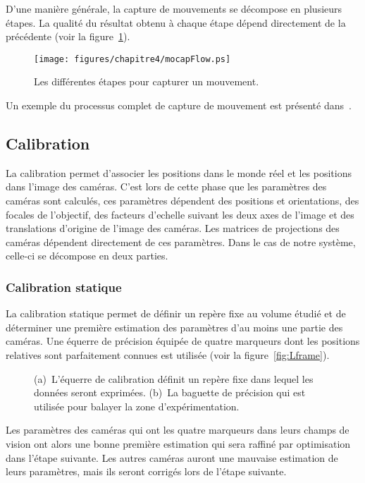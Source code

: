 D'une manière générale, la capture de mouvements se décompose en plusieurs étapes.
La qualité du résultat obtenu à chaque étape dépend directement de la précédente 
(voir la figure~\ref{fig:mocapFlow}).
\begin{figure}[p]
  \begin{center}
    \texttt{[image: figures/chapitre4/mocapFlow.ps]}
  \end{center}
  \caption{Les différentes étapes pour capturer un mouvement.}
  \label{fig:mocapFlow}
\end{figure}
Un exemple du processus complet de capture de mouvement est présenté dans~\cite{bodenheimer97}.

\subsection{Calibration}
La calibration permet d'associer les positions dans le monde réel
et les positions dans l'image des caméras. C'est lors de cette phase que les
paramètres des caméras sont calculés, ces paramètres
dépendent des positions et orientations, des focales de l'objectif,
des facteurs d'echelle suivant les deux axes de l'image et des translations
d'origine de l'image des caméras.
Les matrices de projections des caméras dépendent directement
de ces paramètres.
Dans le cas de notre système, celle-ci se décompose en deux parties. 
\subsubsection{Calibration statique}
La calibration statique permet de définir un repère fixe
au volume étudié et de déterminer une première estimation
des paramètres d'au moins une partie des caméras. Une équerre de précision équipée de quatre marqueurs dont les positions
relatives sont parfaitement connues est utilisée (voir la figure~\ref{fig:Lframe}).
\begin{figure}[t]
  \begin{center}
  \end{center}
  \caption[Outil de calibration.]{(a)~L'équerre de calibration définit un repère fixe dans lequel les données seront exprimées. (b)~La 
  baguette de précision qui est utilisée pour balayer la zone d'expérimentation.}
\end{figure}
Les paramètres des caméras
qui ont les quatre marqueurs dans leurs champs de vision ont alors une bonne première 
estimation qui sera raffiné par optimisation dans l'étape suivante.
Les autres caméras auront une mauvaise estimation de leurs paramètres, mais ils seront corrigés
lors de l'étape suivante.

